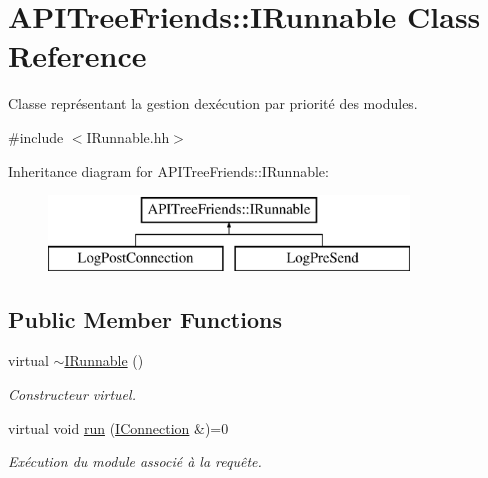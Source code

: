 \hypertarget{class_a_p_i_tree_friends_1_1_i_runnable}{}\section{A\+P\+I\+Tree\+Friends\+:\+:I\+Runnable Class Reference}
\label{class_a_p_i_tree_friends_1_1_i_runnable}


Classe représentant la gestion d\textquotesingle{}exécution par priorité des modules.  




{\ttfamily \#include $<$I\+Runnable.\+hh$>$}

Inheritance diagram for A\+P\+I\+Tree\+Friends\+:\+:I\+Runnable\+:\begin{figure}[H]
\begin{center}
\leavevmode
\includegraphics[height=2.000000cm]{class_a_p_i_tree_friends_1_1_i_runnable}
\end{center}
\end{figure}
\subsection*{Public Member Functions}
\begin{DoxyCompactItemize}
\item 
\hypertarget{class_a_p_i_tree_friends_1_1_i_runnable_a7eceec6f7111a22eff546bca302b7847}{}virtual \hyperlink{class_a_p_i_tree_friends_1_1_i_runnable_a7eceec6f7111a22eff546bca302b7847}{$\sim$\+I\+Runnable} ()\label{class_a_p_i_tree_friends_1_1_i_runnable_a7eceec6f7111a22eff546bca302b7847}

\begin{DoxyCompactList}\small\item\em Constructeur virtuel. \end{DoxyCompactList}\item 
virtual void \hyperlink{class_a_p_i_tree_friends_1_1_i_runnable_a2a8f99d07563ad7a66f30df4fb996f82}{run} (\hyperlink{class_a_p_i_tree_friends_1_1_i_connection}{I\+Connection} \&)=0
\begin{DoxyCompactList}\small\item\em Exécution du module associé à la requête. \end{DoxyCompactList}\end{DoxyCompactItemize}


